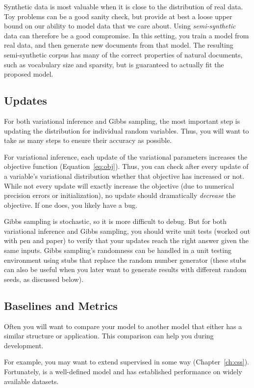 Synthetic data is most valuable when it is close to the distribution of real data.
Toy problems can be a good sanity check, but provide at best a loose upper bound on our ability to model data that we care about.
Using {\em semi-synthetic} data can therefore be a good compromise.
In this setting, you train a model from real data, and then generate new documents from that model.
The resulting semi-synthetic corpus has many of the correct properties of natural documents, such as vocabulary size and sparsity, but is guaranteed to actually fit the proposed model.

\subsection{Updates}

For both variational inference and Gibbs sampling, the most important
step is updating the distribution for individual random variables.
Thus, you will want to take as many steps to ensure their accuracy as
possible.

For variational inference, each update of the variational parameters
increases the objective function (Equation~\ref{eq:obj}).  Thus, you can
check after every update of a variable's variational distribution
whether that objective has increased or not.  While not every update
will exactly increase the objective (due to numerical precision errors or
initialization), no update should dramatically \emph{decrease} the
objective.  If one does, you likely have a bug.

Gibbs sampling is stochastic, so it is more difficult to debug.  But
for both variational inference and Gibbs sampling, you should write
unit tests (worked out with pen and paper) to verify that your updates
reach the right answer given the same inputs.  Gibbs sampling's
randomness can be handled in a unit testing environment using stubs
that replace the random number generator (these stubs can also be
useful when you later want to generate results with different random
seeds, as discussed below).

\subsection{Baselines and Metrics}

Often you will want to compare your model to another model that either
has a similar structure or application.  This comparison can help you during
development.

For example, you may want to extend supervised  in some way
(Chapter~\ref{ch:css}).  Fortunately,  is a well-defined model and
has established performance on widely available datasets.

